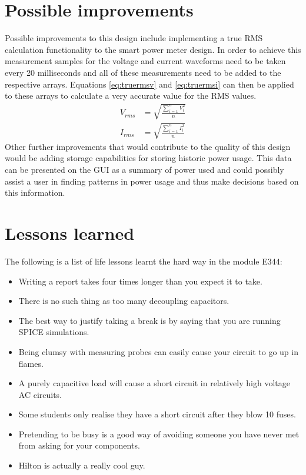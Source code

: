 \section{Possible improvements}
Possible improvements to this design include implementing a true RMS calculation functionality to the smart power meter design.   In order to achieve this measurement samples for the voltage and current waveforms need to be taken every 20 milliseconds and all of these measurements need to be added to the respective arrays. Equations \ref{eq:truermsv} and \ref{eq:truermsi} can then be applied to these arrays to calculate a very accurate value for the RMS values.
\begin{align}
   V_{rms}&=\sqrt{\frac{\sum_{i=1}^{n} V_{i}^2}{n}} \label{eq:truermsv} \\
   I_{rms}&=\sqrt{\frac{\sum_{i=1}^{n} I_{i}^2}{n}} \label{eq:truermsi} 
\end{align}
Other further improvements that would contribute to the quality of this design would be adding storage capabilities for storing historic power usage. This data can be presented on the GUI as a summary of power used and could possibly assist a user in finding patterns in power usage and thus make decisions based on this information.

\section{Lessons learned}
The following is a list of life lessons learnt the hard way in the module E344:
\begin{itemize}
  \item Writing a report takes four times longer than you expect it to take.  
  \item There is no such thing as too many decoupling capacitors. 
  \item The best way to justify taking a break is by saying that you are running SPICE simulations. 
  \item Being clumsy with measuring probes can easily cause your circuit to go up in flames.
  \item A purely capacitive load will cause a short circuit in relatively high voltage AC circuits.
  \item Some students only realise they have a short circuit after they blow 10 fuses.
  \item Pretending to be busy is a good way of avoiding someone you have never met from asking for your components.
  \item Hilton is actually a really cool guy. 
\end{itemize}
